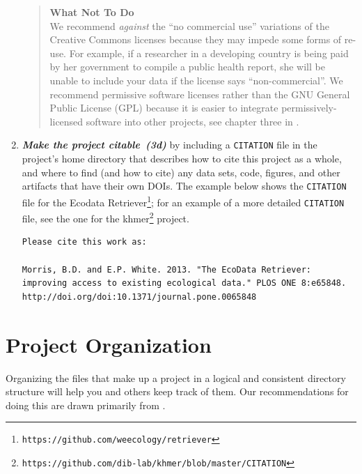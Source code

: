 \documentclass[10pt,letterpaper]{article}
\newcommand{\withurl}[2]{{#1}\footnote{{\texttt{#2}}}}
\newcommand{\practicesection}[2]{\section{#1}\label{#2}}
\newcommand{\practice}[2]{\textbf{\emph{{#2}~({#1})}}}
\begin{document}
\begin{enumerate}
  \begin{quote}
    \noindent \textbf{What Not To Do}
    \\
    We recommend \emph{against} the ``no commercial use'' variations
    of the Creative Commons licenses because they may impede some
    forms of re-use.  For example, if a researcher in a developing
    country is being paid by her government to compile a public health
    report, she will be unable to include your data if the license says
    ``non-commercial''. We recommend permissive software licenses rather
    than the GNU General Public License (GPL) because it is easier to
    integrate permissively-licensed software into other projects,
    see chapter three in \cite{laurent2004}.
  \end{quote}

\item
  \practice{3d}{Make the project citable} by including a
  \texttt{CITATION} file in the project's home directory that
  describes how to cite this project as a whole, and where to find (and how to cite)
  any data sets, code, figures, and other artifacts
  that have their own DOIs.  The example below shows the
  \texttt{CITATION} file for the \withurl{Ecodata
    Retriever}{https://github.com/weecology/retriever}; for an example
  of a more detailed \texttt{CITATION} file, see the one for the
  \withurl{khmer}{https://github.com/dib-lab/khmer/blob/master/CITATION}
  project.

{\small
\begin{verbatim}
Please cite this work as:

Morris, B.D. and E.P. White. 2013. "The EcoData Retriever:
improving access to existing ecological data." PLOS ONE 8:e65848.
http://doi.org/doi:10.1371/journal.pone.0065848
\end{verbatim}
}

\end{enumerate}

\practicesection{Project Organization}{sec:project}

Organizing the files that make up a project in a logical and
consistent directory structure will help you and others keep track of
them.  Our recommendations for doing this are drawn primarily from
\cite{noble2009,gentzkow2014}.
\end{document}
